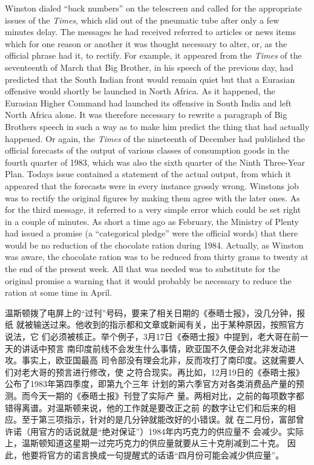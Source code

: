 \begin{paracol}{2}
Winston dialed ``back numbers'' on the telescreen and called for the
appropriate issues of the \emph{Times}, which slid out of the pneumatic
tube after only a few minutes\textquotesingle{} delay. The messages he
had received referred to articles or news items which for one reason or
another it was thought necessary to alter, or, as the official phrase
had it, to rectify. For example, it appeared from the \emph{Times} of
the seventeenth of March that Big Brother, in his speech of the previous
day, had predicted that the South Indian front would remain quiet but
that a Eurasian offensive would shortly be launched in North Africa. As
it happened, the Eurasian Higher Command had launched its offensive in
South India and left North Africa alone. It was therefore necessary to
rewrite a paragraph of Big Brother\textquotesingle s speech in such a
way as to make him predict the thing that had actually happened. Or
again, the \emph{Times} of the nineteenth of December had published the
official forecasts of the output of various classes of consumption goods
in the fourth quarter of 1983, which was also the sixth quarter of the
Ninth Three-Year Plan. Today\textquotesingle s issue contained a
statement of the actual output, from which it appeared that the
forecasts were in every instance grossly wrong.
Winston\textquotesingle s job was to rectify the original figures by
making them agree with the later ones. As for the third message, it
referred to a very simple error which could be set right in a couple of
minutes. As short a time ago as February, the Ministry of Plenty had
issued a promise (a ``categorical pledge'' were the official words) that
there would be no reduction of the chocolate ration during 1984.
Actually, as Winston was aware, the chocolate ration was to be reduced
from thirty grams to twenty at the end of the present week. All that was
needed was to substitute for the original promise a warning that it
would probably be necessary to reduce the ration at some time in April.

\switchcolumn

温斯顿拨了电屏上的``过刊''号码，要来了相关日期的《泰晤士报》，没几分钟，报纸
就被输送过来。他收到的指示都和文章或新闻有关，出于某种原因，按照官方说法，它
们必须被核正。举个例子，3月17日《泰晤士报》中提到，老大哥在前一天的讲话中预言
南印度前线不会发生什么事情，欧亚国不久便会对北非发动进攻。事实上，欧亚国最高
司令部没有理会北非，反而攻打了南印度。这就需要人们对老大哥的预言进行修改，使
之符合现实。再比如，12月19日的《泰晤士报》公布了1983年第四季度，即第九个三年
计划的第六季官方对各类消费品产量的预测。而今天一期的《泰晤士报》刊登了实际产
量。两相对比，之前的每项数字都错得离谱。对温斯顿来说，他的工作就是要改正之前
的数字让它们和后来的相应。至于第三项指示，针对的是几分钟就能改好的小错误。就
在二月份，富部曾许诺（用官方的话说就是``绝对保证''）1984年内巧克力的供应量不
会减少。实际上，温斯顿知道这星期一过完巧克力的供应量就要从三十克削减到二十克。
因此，他要将官方的诺言换成一句提醒式的话语``四月份可能会减少供应量''。


\end{paracol}
